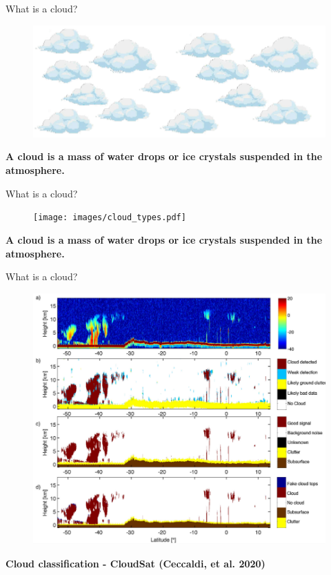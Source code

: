 \begin{frame}{What is a cloud?}
	\begin{center}
		\begin{figure}
			\centering
			\includegraphics[width=0.8\linewidth]{images/intro_fig00_0.png}
			\label{fig:introfig01}
	\end{figure}
	\vspace{20px}
	\textbf{A cloud is a mass of water drops or ice crystals suspended in the atmosphere.}	
	\end{center}
\end{frame}


\begin{frame}{What is a cloud?}
	\begin{center}
		\begin{figure}
			\centering
			\texttt{[image: images/cloud\_types.pdf]}
			\label{fig:introfig01}
		\end{figure}
		\textbf{A cloud is a mass of water drops or ice crystals suspended in the atmosphere.}	
	\end{center}
\end{frame}

\begin{frame}{What is a cloud?}
	\begin{center}
		\begin{figure}
			\centering
			\includegraphics[width=0.65\linewidth]{images/cloud_types2.png}
			\label{fig:introfig01}
		\end{figure}
		\textbf{Cloud classification - CloudSat (Ceccaldi, et al. 2020)}	
	\end{center}
\end{frame}

